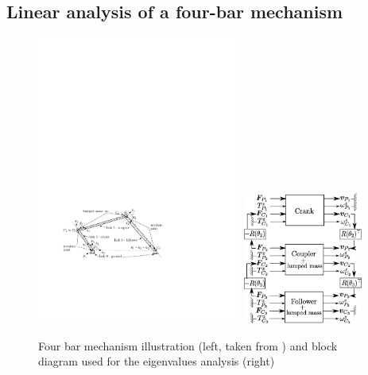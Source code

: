 \documentclass{svjour3}                     %
\begin{document}
\subsection{Linear analysis of a four-bar mechanism}

\begin{figure}[tb]
	\centering
	\includegraphics[width=0.6\textwidth]{fourbars.pdf} 
	\includegraphics[width=0.35\textwidth]{block_4bars.eps} 
	\caption{Four bar mechanism illustration (left, taken from \cite{Chebbi2017}) and block diagram used for the eigenvalues analysis (right)}
	\label{fig:4bars}
\end{figure}
\end{document}
